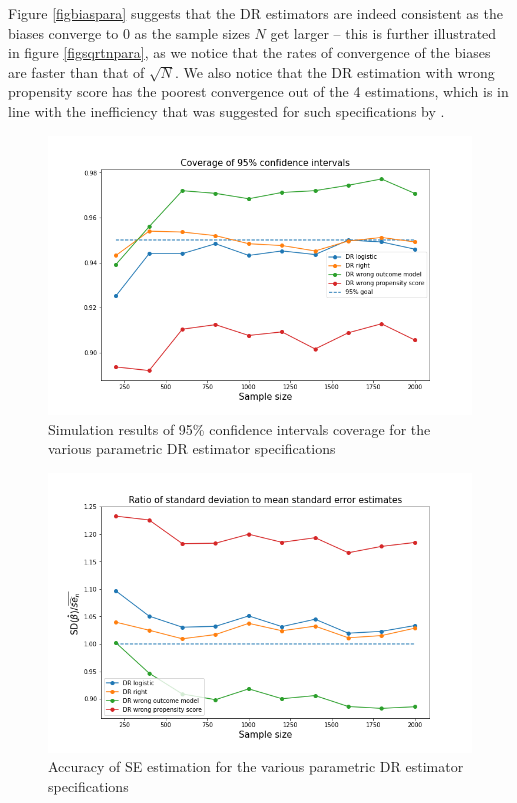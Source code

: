 \documentclass[12pt,twoside]{article}
\begin{document}
Figure \ref{figbiaspara} suggests that the DR estimators are indeed consistent as the biases converge to 0 as the sample sizes $N$ get larger -- this is further illustrated in figure \ref{figsqrtnpara}, as we notice that the rates of convergence of the biases are faster than that of $\sqrt{N}$. We also notice that the DR estimation with wrong propensity score has the poorest convergence out of the 4 estimations, which is in line with the inefficiency that was suggested for such specifications by \citet{kang}.

\begin{figure}[h!]
    \centering
    \includegraphics[width = 0.9\columnwidth]{figures/CIpara.png}
    \caption{Simulation results of 95\% confidence intervals coverage for the various parametric DR estimator specifications}
    \label{figCIpara}
\end{figure}

\begin{figure}[h!]
    \centering
    \includegraphics[width = 0.9\columnwidth]{figures/SEpara.png}
    \caption{Accuracy of \citet{lunceford_davidian} SE estimation for the various parametric DR estimator specifications}
    \label{figSEpara}
\end{figure}
\end{document}
